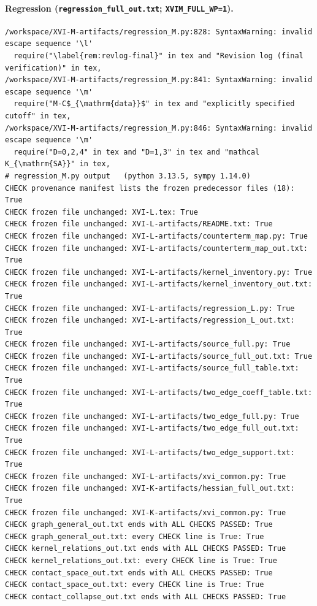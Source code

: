 \documentclass{article}
\theoremstyle{remark}
\begin{document}
\paragraph{Regression (\texttt{regression\_full\_out.txt}; \texttt{XVIM\_FULL\_WP=1}).}
\begin{lstlisting}
/workspace/XVI-M-artifacts/regression_M.py:828: SyntaxWarning: invalid escape sequence '\l'
  require("\label{rem:revlog-final}" in tex and "Revision log (final verification)" in tex,
/workspace/XVI-M-artifacts/regression_M.py:841: SyntaxWarning: invalid escape sequence '\m'
  require("M-C$_{\mathrm{data}}$" in tex and "explicitly specified cutoff" in tex,
/workspace/XVI-M-artifacts/regression_M.py:846: SyntaxWarning: invalid escape sequence '\m'
  require("D=0,2,4" in tex and "D=1,3" in tex and "mathcal K_{\mathrm{SA}}" in tex,
# regression_M.py output   (python 3.13.5, sympy 1.14.0)
CHECK provenance manifest lists the frozen predecessor files (18): True
CHECK frozen file unchanged: XVI-L.tex: True
CHECK frozen file unchanged: XVI-L-artifacts/README.txt: True
CHECK frozen file unchanged: XVI-L-artifacts/counterterm_map.py: True
CHECK frozen file unchanged: XVI-L-artifacts/counterterm_map_out.txt: True
CHECK frozen file unchanged: XVI-L-artifacts/kernel_inventory.py: True
CHECK frozen file unchanged: XVI-L-artifacts/kernel_inventory_out.txt: True
CHECK frozen file unchanged: XVI-L-artifacts/regression_L.py: True
CHECK frozen file unchanged: XVI-L-artifacts/regression_L_out.txt: True
CHECK frozen file unchanged: XVI-L-artifacts/source_full.py: True
CHECK frozen file unchanged: XVI-L-artifacts/source_full_out.txt: True
CHECK frozen file unchanged: XVI-L-artifacts/source_full_table.txt: True
CHECK frozen file unchanged: XVI-L-artifacts/two_edge_coeff_table.txt: True
CHECK frozen file unchanged: XVI-L-artifacts/two_edge_full.py: True
CHECK frozen file unchanged: XVI-L-artifacts/two_edge_full_out.txt: True
CHECK frozen file unchanged: XVI-L-artifacts/two_edge_support.txt: True
CHECK frozen file unchanged: XVI-L-artifacts/xvi_common.py: True
CHECK frozen file unchanged: XVI-K-artifacts/hessian_full_out.txt: True
CHECK frozen file unchanged: XVI-K-artifacts/xvi_common.py: True
CHECK graph_general_out.txt ends with ALL CHECKS PASSED: True
CHECK graph_general_out.txt: every CHECK line is True: True
CHECK kernel_relations_out.txt ends with ALL CHECKS PASSED: True
CHECK kernel_relations_out.txt: every CHECK line is True: True
CHECK contact_space_out.txt ends with ALL CHECKS PASSED: True
CHECK contact_space_out.txt: every CHECK line is True: True
CHECK contact_collapse_out.txt ends with ALL CHECKS PASSED: True

\end{lstlisting}
\end{document}
